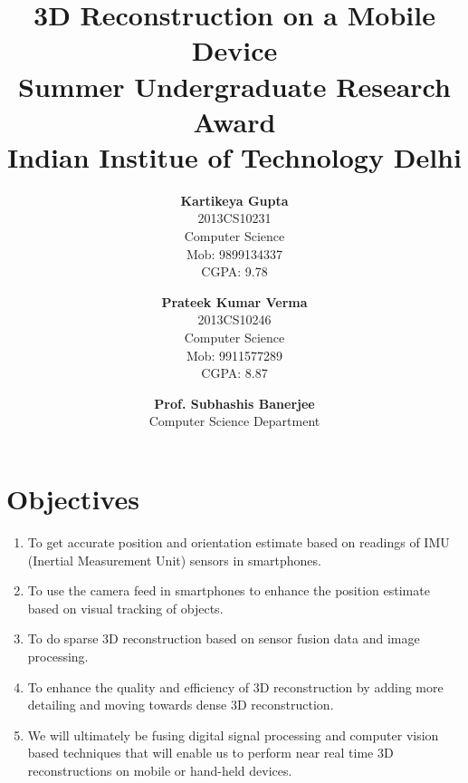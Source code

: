 \documentclass{article}
\title{\vspace*{\fill} \textbf{3D Reconstruction on a Mobile Device}
	  \\ {\large \textbf{Summer Undergraduate Research Award}}
	  \\ {\large \textbf{Indian Institue of Technology Delhi}}}
\author{
	\textbf{Kartikeya Gupta}\\ 
	2013CS10231\\
	Computer Science\\
	Mob: 9899134337\\
	CGPA: 9.78
	\and
	\textbf{Prateek Kumar Verma}\\ 
	2013CS10246\\
	Computer Science\\
	Mob: 9911577289\\
	CGPA: 8.87
}
\date{\textbf{Prof. Subhashis Banerjee} \\ Computer Science Department \vspace*{\fill}}
\begin{document}
	\maketitle

	\newpage
	\section{Objectives}
		\begin{enumerate}
			\item 
				To get accurate position and orientation estimate based on readings of IMU (Inertial Measurement Unit) sensors in smartphones. 
			\item
				To use the camera feed in smartphones to enhance the position estimate based on visual tracking of objects.
			\item 
				To do sparse 3D reconstruction based on sensor fusion data and image processing.
			\item
				To enhance the quality and efficiency of 3D reconstruction by adding more detailing and moving towards dense 3D reconstruction.
			\item
				We will ultimately be fusing digital signal processing and computer vision based techniques that will enable us to perform near real time 3D reconstructions on mobile or hand-held devices.
		\end{enumerate}
\end{document}
